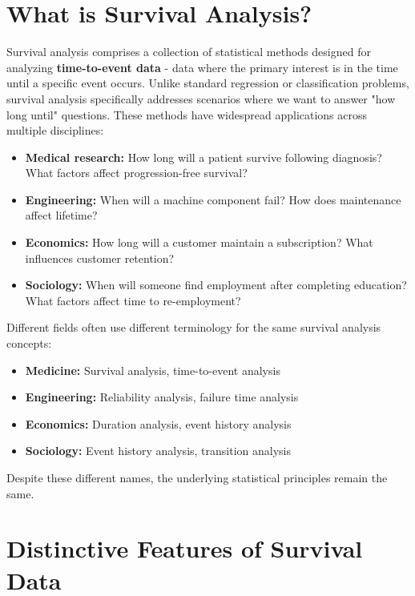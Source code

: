 \section{What is Survival Analysis?}

Survival analysis comprises a collection of statistical methods designed for analyzing \textbf{time-to-event data} - data where the primary interest is in the time until a specific event occurs. Unlike standard regression or classification problems, survival analysis specifically addresses scenarios where we want to answer "how long until" questions. These methods have widespread applications across multiple disciplines:

\begin{itemize}
    \item \textbf{Medical research:} How long will a patient survive following diagnosis? What factors affect progression-free survival?
    \item \textbf{Engineering:} When will a machine component fail? How does maintenance affect lifetime?
    \item \textbf{Economics:} How long will a customer maintain a subscription? What influences customer retention?
    \item \textbf{Sociology:} When will someone find employment after completing education? What factors affect time to re-employment?
\end{itemize}

\begin{notebox}[title=Key Terminology]
Different fields often use different terminology for the same survival analysis concepts:
\begin{itemize}
    \item \textbf{Medicine:} Survival analysis, time-to-event analysis
    \item \textbf{Engineering:} Reliability analysis, failure time analysis
    \item \textbf{Economics:} Duration analysis, event history analysis
    \item \textbf{Sociology:} Event history analysis, transition analysis
\end{itemize}
Despite these different names, the underlying statistical principles remain the same.
\end{notebox}

\section{Distinctive Features of Survival Data}

